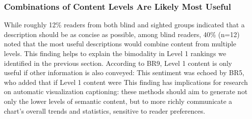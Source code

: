 
\subsubsection{Combinations of Content Levels Are Likely Most Useful}
\label{section:qualResultsD}
While roughly {12}\% readers from both blind and sighted groups indicated that a description should be as concise as possible, among blind readers, {40}\% (n={12}) noted that the most useful descriptions would combine content from multiple levels.
This finding helps to explain the bimodality in Level 1 rankings we identified in the previous section. 
According to BR9, Level 1 content is only useful if other information is also conveyed: 
This sentiment was echoed by BR5, who added that if Level 1 content were 
This finding has implications for research on automatic visualization captioning: these methods should aim to generate not only the lower levels of semantic content, but to more richly communicate a chart’s overall trends and statistics, sensitive to reader preferences.

